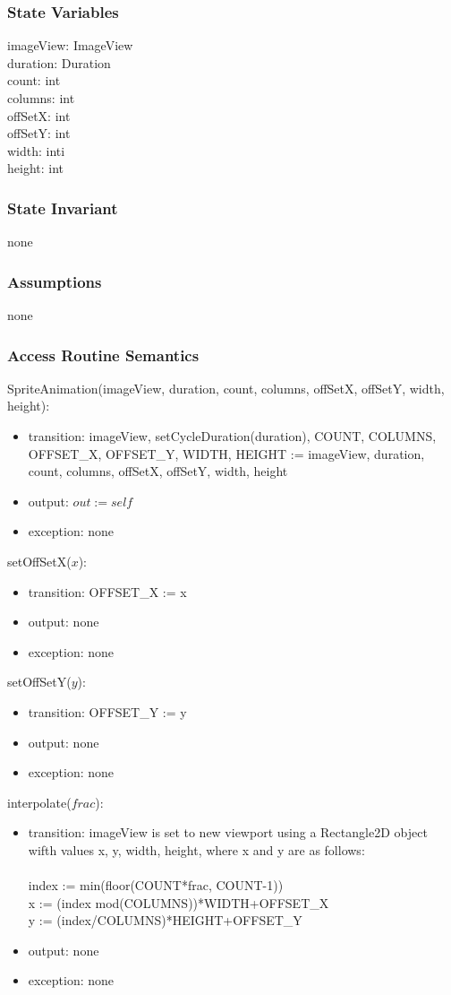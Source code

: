 \documentclass[12pt, titlepage]{article}
\begin{document}
\subsubsection {State Variables}
imageView: ImageView\\
duration: Duration\\
count: int\\
columns: int\\
offSetX: int\\
offSetY: int\\
width: inti\\
height: int\\

\subsubsection {State Invariant}
none
\subsubsection {Assumptions}
none
\subsubsection {Access Routine Semantics}
SpriteAnimation(imageView, duration, count, columns, offSetX, offSetY, width, height):
\begin{itemize}
\item transition: imageView, setCycleDuration(duration), COUNT, COLUMNS, OFFSET\_X, OFFSET\_Y, WIDTH, HEIGHT  := imageView, duration, count, columns, offSetX, offSetY, width, height
\item output: $out := \mathit{self}$
\item exception: none
\end{itemize}
\noindent setOffSetX($x$):
\begin{itemize}
\item transition: OFFSET\_X := x
\item output: none
\item exception: none
\end{itemize}
\noindent setOffSetY($y$):
\begin{itemize}
\item transition: OFFSET\_Y := y
\item output: none
\item exception: none
\end{itemize}
\noindent interpolate($frac$):
\begin{itemize}
\item transition: imageView is set to new viewport using a Rectangle2D object wifth values x, y, width, height, where x and y are as follows: \\ \\
index := min(floor(COUNT*frac, COUNT-1)) \\ 
x := (index mod(COLUMNS))*WIDTH+OFFSET\_X \\
y := (index/COLUMNS)*HEIGHT+OFFSET\_Y \\
\item output: none
\item exception: none
\end{itemize}
\end{document}
